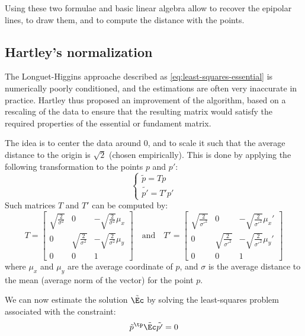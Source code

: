 Using these two formulae and basic linear algebra allow to recover the epipolar lines, to draw them, and to compute the distance with the points.

\subsection{Hartley's normalization}
The Longuet-Higgins approache described as \autoref{eq:least-squares-essential} is numerically poorly conditioned, and the estimations are often very inaccurate in practice. Hartley thus proposed an improvement of the algorithm, based on a rescaling of the data to ensure that the resulting matrix would satisfy the required properties of the essential or fundament matrix.

The idea is to center the data around 0, and to scale it such that the average distance to the origin is $\sqrt{2}$ (chosen empirically). This is done by applying the following transformation to the points $p$ and $p'$:
\begin{equation*}
    \begin{cases}
        \tilde{p} = Tp\\
        \tilde{p'} = T'p'
    \end{cases}
\end{equation*}
Such matrices $T$ and $T'$ can be computed by:
\begin{equation*}
    T = \begin{bmatrix}
        \sqrt{\frac{2}{\sigma^2}} & 0 & -\sqrt{\frac{2}{\sigma^2}}\mu_x \\
        0 & \sqrt{\frac{2}{\sigma^2}} & -\sqrt{\frac{2}{\sigma^2}}\mu_y \\
        0 & 0 & 1
    \end{bmatrix}
    \quad\text{and}\quad
    T' = \begin{bmatrix}
        \sqrt{\frac{2}{\sigma'^2}} & 0 & -\sqrt{\frac{2}{\sigma'^2}}\mu_x' \\
        0 & \sqrt{\frac{2}{\sigma'^2}} & -\sqrt{\frac{2}{\sigma'^2}}\mu_y' \\
        0 & 0 & 1
    \end{bmatrix}
\end{equation*}
where $\mu_x$ and $\mu_y$ are the average coordinate of $p$, and $\sigma$ is the average distance to the mean (average norm of the vector) for the point $p$.

We can now estimate the solution $\tilde{\Ec}$ by solving the least-squares problem associated with the constraint:
\begin{equation}
    \label{eq:normalized-essential}
    \tilde{p}^\tp\tilde{\Ec}\tilde{p'}=0
\end{equation}

